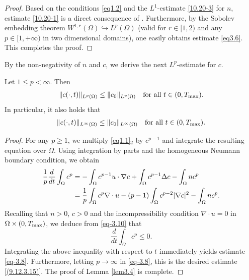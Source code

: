 \documentclass[reqno]{amsart}
\begin{document}
\begin{proof} 
Based on the conditions \eqref{eq1.2} and the $L^1$-estimate \eqref{10.20-3} for $n$, 
estimate \eqref{10.20-1} is a direct consequence of \cite[Lemma 2.5]{Wang-Xiang}. 
Furthermore, by the Sobolev embedding theorem 
$W^{1,r}(\Omega)\hookrightarrow L^p(\Omega)$ (valid for $r\in[1,2)$ and any 
$p\in[1,+\infty)$ in two dimensional domains), one easily obtains estimate \eqref{eq3.6}. 
This completes the proof.
\end{proof}

By the non-negativity of $n$ and $c$, we derive the next $L^p$-estimate for $c$.

\begin{lemma}\label{lem3.4}
Let $1 \leq p <\infty $. Then
\begin{align}\label{eq-3.8}
\|c(\cdot,t)\|_{L^p(\Omega)} \leq \|c_0\|_{L^p(\Omega)} \quad 
\text{for all } t \in (0, T_{\rm max}).
\end{align}
In particular, it also holds that
\begin{align}\label{(9.12.3.15)}
\|c(\cdot,t)\|_{L^\infty(\Omega)} \leq \|c_0\|_{L^\infty(\Omega)} \quad 
\text{for all } t \in (0, T_{\rm max}).
\end{align}
\end{lemma}

\begin{proof} 
For any \(p \geq 1\), we multiply \eqref{eq1.1}$_2$ by \(c^{p - 1}\) and integrate 
the resulting equation over \(\Omega\). Using integration by parts and the homogeneous 
Neumann boundary condition, we obtain
\begin{align}\label{eq-3.10}
\frac{1}{p} \frac{d}{dt} \int_{\Omega} c^p &= -\int_{\Omega} c^{p - 1} u \cdot \nabla c + \int_{\Omega} c^{p-1} \Delta c-\int_{\Omega} n c^p
\notag\\
&= \frac{1}{p} \int_{\Omega} c^p \nabla \cdot u - (p - 1) \int_{\Omega} c^{p - 2} |\nabla c|^2 - \int_{\Omega} n c^p.
\end{align}
Recalling that $n > 0$, $c > 0$ and the incompressibility condition $\nabla \cdot u = 0$ in $\Omega \times (0, T_{\rm max})$, we deduce from \eqref{eq-3.10} that
\[
 \frac{d}{dt} \int_{\Omega} c^p \leq 0.
\]
Integrating the above inequality with respect to \(t\) immediately yields estimate 
\eqref{eq-3.8}.
Furthermore, letting $ p \rightarrow \infty$ in \eqref{eq-3.8}, this is the 
desired estimate \eqref{(9.12.3.15)}. The proof of Lemma \ref{lem3.4} is
complete. 
\end{proof}
\end{document}
